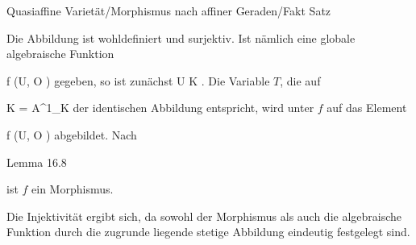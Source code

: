 {Quasiaffine Varietät/Morphismus nach affiner Geraden/Fakt}
{Satz}
{}
{



\faktsituation {}
\faktzusatz {}





}
{





Die Abbildung ist wohldefiniert und surjektiv. Ist nämlich eine globale algebraische Funktion

\mavergleichskette
{\vergleichskette
{ f
}
{ \in }{ \Gamma (U, {\mathcal O} )
}
{  }{
}
{    }{
}
{   }{
}
}
{}{}{}
gegeben, so ist zunächst
 { U } { K
} {.}
Die Variable $T$, die auf

\mavergleichskette
{\vergleichskette
{ K
}
{ = }{ {\mathbb A}^{1}_{K}
}
{  }{
}
{    }{
}
{   }{
}
}
{}{}{}
der identischen Abbildung entspricht, wird unter
 {} {}
$f$ auf das Element

\mavergleichskette
{\vergleichskette
{ f
}
{ \in }{ \Gamma (U, {\mathcal O} )
}
{  }{
}
{    }{
}
{   }{
}
}
{}{}{}
abgebildet. Nach

Lemma 16.8

ist $f$ ein Morphismus.

Die Injektivität ergibt sich, da sowohl der Morphismus als auch die algebraische Funktion durch die zugrunde liegende stetige Abbildung eindeutig festgelegt sind.




}






